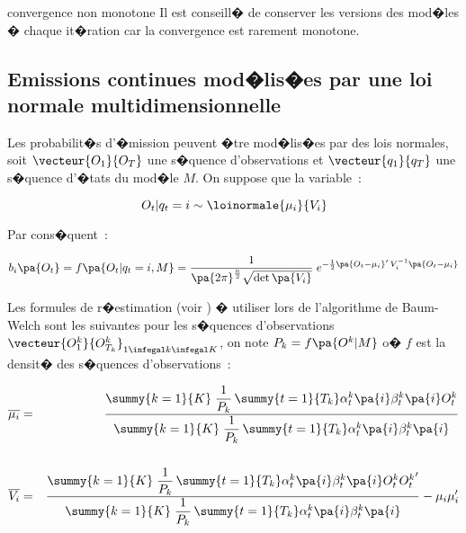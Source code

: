 \begin{xremark}{convergence non monotone}
Il est conseill� de conserver les versions des mod�les � chaque it�ration car la convergence est rarement monotone.
\end{xremark}










\subsection{Emissions continues mod�lis�es par une loi normale multidimensionnelle}
\label{hmm_loi_normale_emission_section}
%
%

Les probabilit�s d'�mission peuvent �tre mod�lis�es par des lois normales, soit $\vecteur{O_1}{O_T}$ une s�quence d'observations et $\vecteur{q_1}{q_T}$ une s�quence d'�tats du mod�le $M$. On suppose que la variable~:

        $$
        O_t | q_t = i \sim \loinormale{\mu_i}{V_i}
        $$
        
Par cons�quent~:

        $$
        b_i\pa{O_t} = f\pa{O_t | q_t = i,M} = \dfrac{1}{\pa{2\pi}^{\frac{n}{2}} \sqrt{ \det \pa{ V_i}} }
                                \; e ^{ - \frac{1}{2} \pa{O_t - \mu_i}' \,  V_i^{-1} \pa{O_t - \mu_i}             }
        $$

Les formules de r�estimation (voir ) � utiliser lors de l'algorithme de Baum-Welch sont les suivantes pour les s�quences d'observations $\vecteur{O^k_1}{O^k_{T_k}}_{1 \infegal k \infegal K}$, on note $P_k = f\pa{O^k|M}$ o� $f$ est la densit� des s�quences d'observations~:%

%

        \begin{eqnarray}
        \overline {\mu_{i}} &=& \dfrac      {   \summy{k=1}{K} \; \dfrac{1}{P_k} \,  
                                                                                        \summy{t=1}{T_k}  \alpha_t^k\pa{i} \beta_t^k\pa{i} O_t^k }
                                            {   \summy{k=1}{K} \; \dfrac{1}{P_k} \,  
                                                    \summy{t=1}{T_k}   \alpha_t^k\pa{i} \beta_t^k\pa{i}  } \\
        && \nonumber\\
        \overline {V_{i}} &=& \dfrac        {   \summy{k=1}{K} \; \dfrac{1}{P_k} \,  
                                                                                        \summy{t=1}{T_k}   \alpha_t^k\pa{i} \beta_t^k\pa{i} O_t^k {O_t^k}' }
                                            {   \summy{k=1}{K} \; \dfrac{1}{P_k} \,  
                                                    \summy{t=1}{T_k}   \alpha_t^k\pa{i} \beta_t^k\pa{i}  }
                            - \mu_i \mu'_i
        \end{eqnarray}


